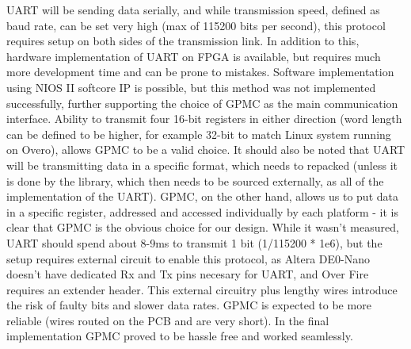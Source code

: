 UART will be sending data serially, and while transmission speed, defined as baud rate, can be set very high (max of 115200 bits per second), this protocol requires setup on both sides of the transmission link. In addition to this, hardware implementation of UART on FPGA is available, but requires much more development time and can be prone to mistakes. Software implementation using NIOS II softcore IP is possible, but this method was not implemented successfully, further supporting the choice of GPMC as the main communication interface. Ability to transmit four 16-bit registers in either direction (word length can be defined to be higher, for example 32-bit to match Linux system running on Overo), allows GPMC to be a valid choice. It should also be noted that UART will be transmitting data in a specific format, which needs to repacked (unless it is done by the library, which then needs to be sourced externally, as all of the implementation of the UART). GPMC, on the other hand, allows us to put data in a specific register, addressed and accessed individually by each platform - it is clear that GPMC is the obvious choice for our design. While it wasn't measured, UART should spend about 8-9ms to transmit 1 bit (1/115200 * 1e6), but the setup requires external circuit to enable this protocol, as Altera DE0-Nano doesn't have dedicated Rx and Tx pins necesary for UART, and Over Fire requires an extender header. This external circuitry plus lengthy wires introduce the risk of faulty bits and slower data rates. GPMC is expected to be more reliable (wires routed on the PCB and are very short). In the final implementation GPMC proved to be hassle free and worked seamlessly.
